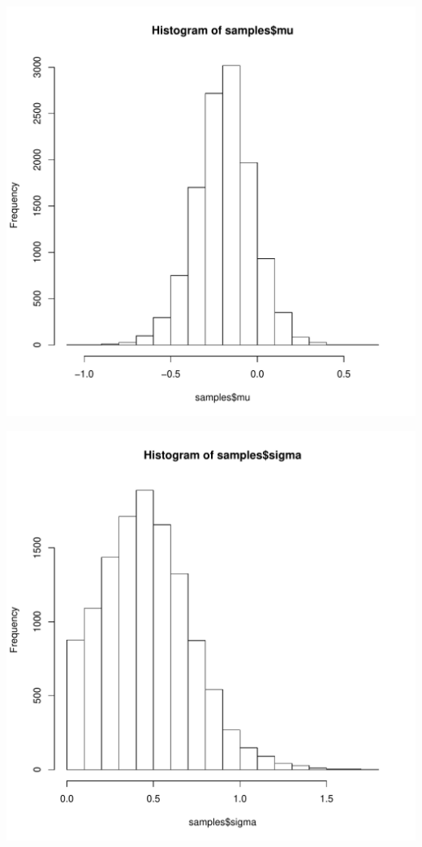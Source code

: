 \documentclass{article}\usepackage[]{graphicx}\usepackage[]{color}
\newenvironment{knitrout}{}{} %
\begin{document}
\begin{knitrout}
\color{fgcolor}
\includegraphics[width=5.5in]{figure/p3cCompleteHist-1} 

\includegraphics[width=5.5in]{figure/p3cCompleteHist-2} 


\end{knitrout}
\end{document}
